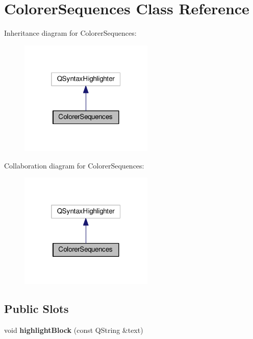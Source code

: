 \hypertarget{classColorerSequences}{\section{Colorer\+Sequences Class Reference}
\label{classColorerSequences}
}


Inheritance diagram for Colorer\+Sequences\+:\nopagebreak
\begin{figure}[H]
\begin{center}
\leavevmode
\includegraphics[width=181pt]{classColorerSequences__inherit__graph}
\end{center}
\end{figure}


Collaboration diagram for Colorer\+Sequences\+:\nopagebreak
\begin{figure}[H]
\begin{center}
\leavevmode
\includegraphics[width=181pt]{classColorerSequences__coll__graph}
\end{center}
\end{figure}
\subsection*{Public Slots}
\begin{DoxyCompactItemize}
\item 
\hypertarget{classColorerSequences_a33fa40a05a61f1a9448c8c16fc07f0b4}{void {\bfseries highlight\+Block} (const Q\+String \&text)}\label{classColorerSequences_a33fa40a05a61f1a9448c8c16fc07f0b4}

\end{DoxyCompactItemize}
